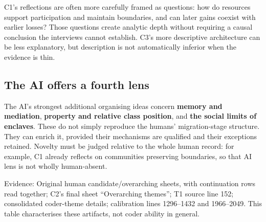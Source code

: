 \documentclass[10pt,a4paper]{article}
\newcommand{\source}[1]{{\footnotesize\color{muted}Evidence: #1}\par}
\begin{document}
C1's reflections are often more carefully framed as questions: how do resources support participation and maintain boundaries, and can later gains coexist with earlier losses? Those questions create analytic depth without requiring a causal conclusion the interviews cannot establish. C3's more descriptive architecture can be less explanatory, but description is not automatically inferior when the evidence is thin.

\subsection*{The AI offers a fourth lens}
The AI's strongest additional organising ideas concern \textbf{memory and mediation}, \textbf{property and relative class position}, and \textbf{the social limits of enclaves}. These do not simply reproduce the humans' migration-stage structure. They can enrich it, provided their mechanisms are qualified and their exceptions retained. Novelty must be judged relative to the whole human record: for example, C1 already reflects on communities preserving boundaries, so that AI lens is not wholly human-absent.

\source{Original human candidate/overarching sheets, with continuation rows read together; C2's final sheet ``Overarching themes''; T1 source line 152; consolidated coder-theme details; calibration lines 1296--1432 and 1966--2049. This table characterises these artifacts, not coder ability in general.}
\end{document}
